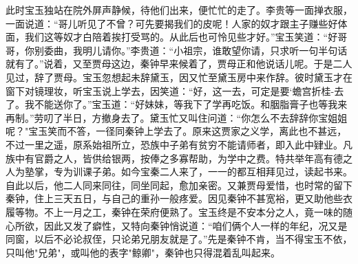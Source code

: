 此时宝玉独站在院外屏声静候，待他们出来，便忙忙的走了。李贵等一面掸衣服，一面说道：“哥儿听见了不曾？可先要揭我们的皮呢！人家的奴才跟主子赚些好体面，我们这等奴才白陪着挨打受骂的。从此后也可怜见些才好。”宝玉笑道：“好哥哥，你别委曲，我明儿请你。”李贵道：“小祖宗，谁敢望你请，只求听一句半句话就有了。”说着，又至贾母这边，秦钟早来候着了，贾母正和他说话儿呢。于是二人见过，辞了贾母。宝玉忽想起未辞黛玉，因又忙至黛玉房中来作辞。彼时黛玉才在窗下对镜理妆，听宝玉说上学去，因笑道：“好，这一去，可定是要`蟾宫折桂-去了。我不能送你了。”宝玉道：“好妹妹，等我下了学再吃饭。和胭脂膏子也等我来再制。”劳叨了半日，方撤身去了。黛玉忙又叫住问道：“你怎么不去辞辞你宝姐姐呢？"宝玉笑而不答，一径同秦钟上学去了。原来这贾家之义学，离此也不甚远，不过一里之遥，原系始祖所立，恐族中子弟有贫穷不能请师者，即入此中肄业。凡族中有官爵之人，皆供给银两，按俸之多寡帮助，为学中之费。特共举年高有德之人为塾掌，专为训课子弟。如今宝秦二人来了，一一的都互相拜见过，读起书来。自此以后，他二人同来同往，同坐同起，愈加亲密。又兼贾母爱惜，也时常的留下秦钟，住上三天五日，与自己的重孙一般疼爱。因见秦钟不甚宽裕，更又助他些衣履等物。不上一月之工，秦钟在荣府便熟了。宝玉终是不安本分之人，竟一味的随心所欲，因此又发了癖性，又特向秦钟悄说道：“咱们俩个人一样的年纪，况又是同窗，以后不必论叔侄，只论弟兄朋友就是了。”先是秦钟不肯，当不得宝玉不依，只叫他"兄弟"，或叫他的表字"鲸卿"，秦钟也只得混着乱叫起来。


